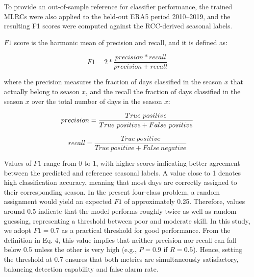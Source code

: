 To provide an out-of-sample reference for classifier performance, the trained MLRCs were also applied to the held-out ERA5 period 2010--2019, and the resulting F1 scores were computed against the RCC-derived seasonal labels.


$F1$ score is the harmonic mean of precision and recall, and it is defined as:

\begin{linenomath*}
    \begin{equation}
        F1=2*\frac{precision*recall}{precision+recall}
    \end{equation}
\end{linenomath*}

where the precision measures the fraction of days classified in the season $x$ that actually belong to season $x$, and the recall the fraction of days classified in the season $x$ over the total number of days in the season $x$:

\begin{linenomath*}
    \begin{equation}
            precision = \frac{True\ positive}{True\ positive + False\ positive}\\
    \end{equation}
\end{linenomath*}

\begin{linenomath*}
    \begin{equation}
            recall = \frac{True\ positive}{True\ positive + False\ negative}
    \end{equation}
\end{linenomath*}

Values of $F1$ range from 0 to 1, with higher scores indicating better agreement between the predicted and reference seasonal labels. 
A value close to 1 denotes high classification accuracy, meaning that most days are correctly assigned to their corresponding season. 
In the present four-class problem, a random assignment would yield an expected $F1$ of approximately 0.25. 
Therefore, values around 0.5 indicate that the model performs roughly twice as well as random guessing, representing a threshold between poor and moderate skill. 
In this study, we adopt $F1 = 0.7$ as a practical threshold for good performance. 
From the definition in Eq. 4, this value implies that neither precision nor recall can fall below 0.5 unless the other is very high (e.g., $P = 0.9$ if $R = 0.5$). 
Hence, setting the threshold at 0.7 ensures that both metrics are simultaneously satisfactory, balancing detection capability and false alarm rate.

